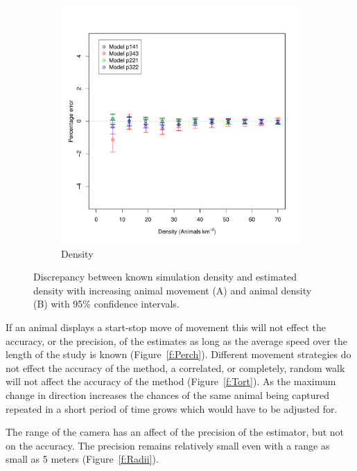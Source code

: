 \documentclass[a4paper,10pt,reqno,oneside]{amsart}
\begin{document}
\begin{figure}[t]
\begin{subfigure}[t]{0.5\textwidth}
		\includegraphics[width=1\textwidth]{imgs/ResultsDensitySubsample.pdf}
                \caption{Density}
                \label{f:Density}
        \end{subfigure}
	\caption{Discrepancy between known simulation density and estimated density with increasing animal movement (A) and animal density (B) with 95\% confidence intervals.}
	\label{f:distanceAnimal}
\end{figure}


If an animal displays a start-stop move of movement this will not effect the accuracy, or the precision, of the estimates as long as the average speed over the length of the study is known (Figure~\ref{f:Perch}). Different movement strategies do not effect the accuracy of the method, a correlated, or completely, random walk will not affect the accuracy of the method (Figure~\ref{f:Tort}). As the maximum change in direction increases the chances of the same animal being captured repeated in a short period of time grows which would have to be adjusted for. 

The range of the camera has an affect of the precision of the estimator, but not on the accuracy. The precision remains relatively small even with a range as small as 5 meters (Figure~\ref{f:Radii}). 
\end{document}
